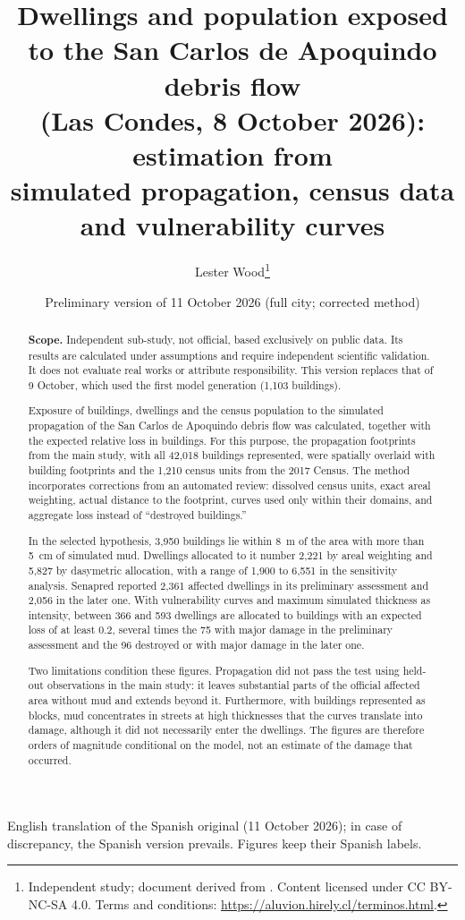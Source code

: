 \documentclass[10pt,a4paper]{article}
\title{Dwellings and population exposed to the San Carlos de Apoquindo debris flow\\(Las Condes, 8 October 2026): estimation from\\simulated propagation, census data and vulnerability curves}
\author{Lester Wood\thanks{Independent study; document derived from \citet{wood2026}. Content licensed under CC BY-NC-SA 4.0. Terms and conditions: \url{https://aluvion.hirely.cl/terminos.html}.}}
\date{Preliminary version of 11 October 2026 (full city; corrected method)}
\begin{document}
\maketitle

\begin{abstract}
\noindent\textbf{Scope.} Independent sub-study, not official, based exclusively on public data. Its results are calculated under assumptions and require independent scientific validation. It does not evaluate real works or attribute responsibility. This version replaces that of 9 October, which used the first model generation (1,103 buildings).\par\medskip
\noindent Exposure of buildings, dwellings and the census population to the simulated propagation of the San Carlos de Apoquindo debris flow was calculated, together with the expected relative loss in buildings. For this purpose, the propagation footprints from the main study, with all 42,018 buildings represented, were spatially overlaid with building footprints and the 1,210 census units from the 2017 Census. The method incorporates corrections from an automated review: dissolved census units, exact areal weighting, actual distance to the footprint, curves used only within their domains, and aggregate loss instead of ``destroyed buildings.''

In the selected hypothesis, 3,950 buildings lie within 8~m of the area with more than \SI{5}{cm} of simulated mud. Dwellings allocated to it number 2,221 by areal weighting and 5,827 by dasymetric allocation, with a range of 1,900 to 6,551 in the sensitivity analysis. Senapred reported 2,361 affected dwellings in its preliminary assessment and 2,056 in the later one. With vulnerability curves and maximum simulated thickness as intensity, between 366 and 593 dwellings are allocated to buildings with an expected loss of at least 0.2, several times the 75 with major damage in the preliminary assessment and the 96 destroyed or with major damage in the later one.

Two limitations condition these figures. Propagation did not pass the test using held-out observations in the main study: it leaves substantial parts of the official affected area without mud and extends beyond it. Furthermore, with buildings represented as blocks, mud concentrates in streets at high thicknesses that the curves translate into damage, although it did not necessarily enter the dwellings. The figures are therefore orders of magnitude conditional on the model, not an estimate of the damage that occurred.
\end{abstract}
{\small\noindent English translation of the Spanish original (11 October 2026); in case of discrepancy, the Spanish version prevails. Figures keep their Spanish labels.\par}
\end{document}
